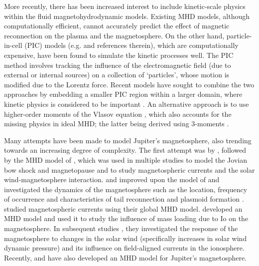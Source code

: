 More recently, there has been increased interest to include kinetic-scale physics within the fluid magnetohydrodynamic models. Existing MHD models, although computationally efficient, cannot accurately predict the effect of magnetic reconnection on the plasma and the magnetosphere. On the other hand, particle-in-cell (PIC) models (e.g.  and references therein), which are computationally expensive, have been found to simulate the kinetic processes well. The PIC method involves tracking the influence of the electromagnetic field (due to external or internal sources) on a collection of `particles', whose motion is modified due to the Lorentz force. Recent models have sought to combine the two approaches by embedding a smaller PIC region within a larger domain, where kinetic physics is considered to be important \cite{Daldorff2014Two-wayModel}. An alternative approach is to use higher-order moments of the Vlasov equation \cite{Wang2015ComparisonReconnection}, which also accounts for the missing physics in ideal MHD; the latter being derived using 3-moments .

Many attempts have been made to model Jupiter's magnetosphere, also trending towards an increasing degree of complexity. The first attempt was by , followed by the MHD model of , which was used in multiple studies to model the Jovian bow shock and magnetopause \cite{Joy2002a} and to study magnetospheric currents and the solar wind‐magnetosphere interaction.  and  improved upon the model of  and investigated the dynamics of the magnetosphere such as the location, frequency of occurrence and characteristics of tail reconnection and plasmoid formation \cite{Fukazawa2010a}.  studied magnetospheric currents using their global MHD model.  developed an MHD model and used it to study the influence of mass loading due to Io on the magnetosphere. In subsequent studies \cite{Chane2017a,Chane2018}, they investigated the response of the magnetosphere to changes in the solar wind (specifically increases in solar wind dynamic pressure) and its influence on field‐aligned currents in the ionosphere. Recently,  and  have also developed an MHD model for Jupiter's magnetosphere.


